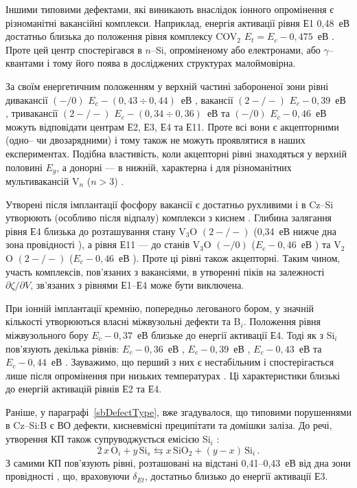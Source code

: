 Іншими типовими дефектами, які виникають внаслідок іонного опромінення є різноманітні
вакансійні комплекси.
Наприклад, енергія активації рівня Е1 0,48~еВ достатньо близька до положення рівня
комплексу COV$_2$  $E_t=E_c-0,475$~еВ \cite{Lugakov}.
Проте цей центр спостерігався в $n$--Si, опроміненому або електронами, або $\gamma$--квантами \cite{Lugakov} і тому його поява в досліджених структурах малоймовірна.

За своїм енергетичним положенням у верхній частині
забороненої зони рівні дивакансії $(-/0)$ $E_c-(0,43\div0,44)$~еВ \cite{V2:JAP2014,V2:PRB2002},
вакансії $(2-/-)$ $E_c-0,39$~еВ \cite{MSER55},
тривакансії $(2-/-)$ $E_c-(0,34\div0,36)$~еВ та $(-/0)$ $E_c-0,46$~еВ \cite{V3:PRB2012,V3:Markevich}
можуть відповідати центрам Е2, Е3, Е4 та Е11.
Проте всі вони є акцепторними (одно-- чи двозарядними) і тому також не можуть проявлятися
в наших експериментах.
Подібна властивість, коли акцепторні рівні знаходяться у верхній половині $E_g$,
а донорні --- в нижній, характерна і для різноманітних мультивакансій V$_n$ ($n>3$) \cite{Si:multiV}.

Утворені після імплантації фосфору вакансії є достатньо рухливими і в Cz--Si
утворюють (особливо після відпалу) комплекси з киснем \cite{V2toV2O}.
Глибина залягання рівня Е4 близька до розташування стану V$_3$O $(2-/-)$ (0,34~еВ нижче дна зона провідності \cite{V3:Markevich}),
а рівня Е11 --- до станів V$_3$O $(-/0)$ ($E_c-0,46$~еВ \cite{V3:Markevich})
та V$_2$O $(2-/-)$ ($E_c-0,46$~еВ \cite{V2:JAP2014}).
Проте ці рівні також акцепторні.
Таким чином, участь комплексів, пов'язаних з вакансіями, в утворенні
піків на залежності $\partial \zeta/ \partial V $, зв'язаних з рівнями Е1--Е4 може бути виключена.

При іонній імплантації кремнію, попередньо легованого бором,
у значній кількості утворюються власні міжвузольні дефекти та B$_i$.
Положення рівня міжвузольного бору $E_c-0,37$~еВ \cite{Bi:Harris} близьке до  енергії активації Е4.
Тоді як з Si$_i$ пов'язують декілька рівнів: $E_c-0,36$~еВ \cite{MSER55},
$E_c-0,39$~еВ \cite{MSER55,Si:Sii}, $E_c-0,43$~еВ \cite{Si:Sii} та
$E_c-0,44$~еВ \cite{VI:Luc}.
Зауважимо, що перший з них є нестабільним і спостерігається лише після опромінення при низьких температурах \cite{MSER55}.
Ці характеристики близькі до енергій активацій рівнів Е2 та Е4.

Раніше, у параграфі~\ref{sbDefectType}, вже згадувалося, що
типовими порушеннями в Cz--Si:B є ВО дефекти, кисневмісні преципітати та домішки заліза.
До речі, утворення КП також супруводжується емісією Si$_i$ \cite{MSER13}:
\begin{equation*}\label{eqSiO}
  2\,x\,\mbox{O}_i+y\,\mbox{Si}_s\leftrightarrows x\,\mbox{SiO}_2+(y-x)\,\mbox{Si}_i\,.
\end{equation*}
З самими КП пов'язують рівні, розташовані на відстані 0,41--0,43~еВ від дна зони провідності \cite{SiO:Mchedlidze,SiO:Vanhell,SiO:Chan}, що, враховуючи  $\delta_{Et}$, достатньо близько до енергії активації Е3.

